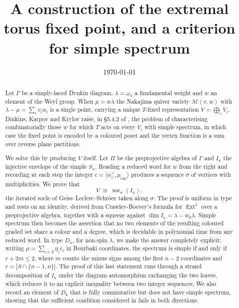 \documentclass[11pt,reqno]{amsart}
\theoremstyle{plain}
\theoremstyle{definition}
\DeclareMathOperator{\soc}{soc}
\DeclareMathOperator{\Ext}{Ext}
\newcommand{\Pia}{\Pi}
\newcommand{\dimv}{\underline{\dim}}
\newcommand{\al}{\alpha}
\newcommand{\om}{\omega}
\newcommand{\la}{\lambda}
\newcommand{\ka}{\kappa}
\newcommand{\Mvw}{\mathcal{M}}
\begin{document}
\title[Simple spectrum at extremal fixed points]
      {A construction of the extremal torus fixed point, and a criterion for
       simple spectrum}

\author{}
\date{\today}

\begin{abstract}
Let $\Gamma$ be a simply-laced Dynkin diagram, $\la=\om_\ka$ a fundamental
weight and $w$ an element of the Weyl group.  When $\mu=w\la$ the Nakajima
quiver variety $\Mvw(v,w)$ with $\la-\mu=\sum_i v_i\al_i$ is a single point,
carrying a unique $T$-fixed representation $V=\bigoplus_i V_i$.  Dinkins,
Karpov and Krylov raise, in \S5.4.2 of \cite{DKK}, the problem of
characterising combinatorially those $w$ for which $T$ acts on every $V_i$
with simple spectrum, in which case the fixed point is encoded by a coloured
poset and the vertex function is a sum over reverse plane partitions.

We solve this by producing $V$ itself.  Let $\Pia$ be the preprojective
algebra of $\Gamma$ and $I_\ka$ the injective envelope of the simple
$S_\ka$.  Reading a reduced word for $w$ from the right and recording at each
step the integer $c=\langle\al_i^\vee,\mu_{\mathrm{cur}}\rangle$ produces a
sequence $\sigma$ of vertices with multiplicities.  We prove that
\[
   V \;\cong\; \soc_{\sigma}\!\left(I_\ka\right),
\]
the iterated socle of Geiss--Leclerc--Schr\"oer taken along $\sigma$.  The
proof is uniform in type and rests on an identity, derived from
Crawley-Boevey's formula for $\Ext^1$ over a preprojective algebra, together
with a squeeze against $\dimv I_\ka=\la-w_0\la$.  Simple spectrum then becomes
the assertion that no two elements of the resulting coloured graded set share a
colour and a degree, which is decidable in polynomial time from any reduced
word.  In type $D_n$, for non-spin $\la$, we make the answer completely explicit:
writing $\mu=\sum_{i\in S}\eta_ie_i$ in Bourbaki coordinates, the spectrum is
simple if and only if $r+2m\le 2$, where $m$ counts the minus signs among the
first $n-2$ coordinates and $r=|S\cap\{n-1,n\}|$.  The proof of this last statement runs through a
strand decomposition of $I_\ka$ under the diagram automorphism exchanging the
two leaves, which reduces it to an explicit inequality between two integer
sequences.  We also record an element of $D_4$ that
is fully commutative but does not have simple spectrum, showing that the
sufficient condition considered in \cite[Ex.~5.12]{DKK} fails in both
directions.
\end{abstract}
\end{document}
